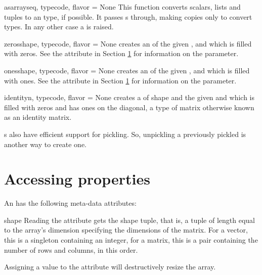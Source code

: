 \begin{funcdesc}{asarray}{seq, typecode, flavor = None}
  This function converts scalars, lists and tuples to an
   type, if possible. It passes s through,
  making copies only to convert types.  In any other case a
   is raised.
\end{funcdesc}

\begin{funcdesc}{zeros}{shape, typecode, flavor = None}
   creates an  of the given ,
   and  which is filled with zeros. See the
   attribute in Section \ref{sec:arrayproperties} for
  information on the  parameter.
\end{funcdesc}

\begin{funcdesc}{ones}{shape, typecode, flavor = None}
   creates an  of the given ,
   and  which is filled with ones. See the
   attribute in Section \ref{sec:arrayproperties} for
  information on the  parameter.
\end{funcdesc}

\begin{funcdesc}{identity}{n, typecode, flavor = None}
   creates a  of shape  and
  the given  and  which is filled with
  zeros and has ones on the diagonal, a type of matrix otherwise
  known as an identity matrix.
\end{funcdesc}

s also have efficient support for pickling. So, unpickling
a previously pickled  is another way to create one.

\section{Accessing  properties}

\label{sec:arrayproperties}
An  has the following meta-data attributes:

\begin{memberdesc}[Array]{shape}
  Reading the  attribute gets the shape tuple, that is,
  a tuple of length equal to the array's dimension specifying the
  dimensions of the matrix.  For a vector, this is a singleton
  containing an integer, for a matrix, this is a pair containing the
  number of rows and columns, in this order.  

  Assigning a value to the  attribute will destructively
  resize the array.
\end{memberdesc}

